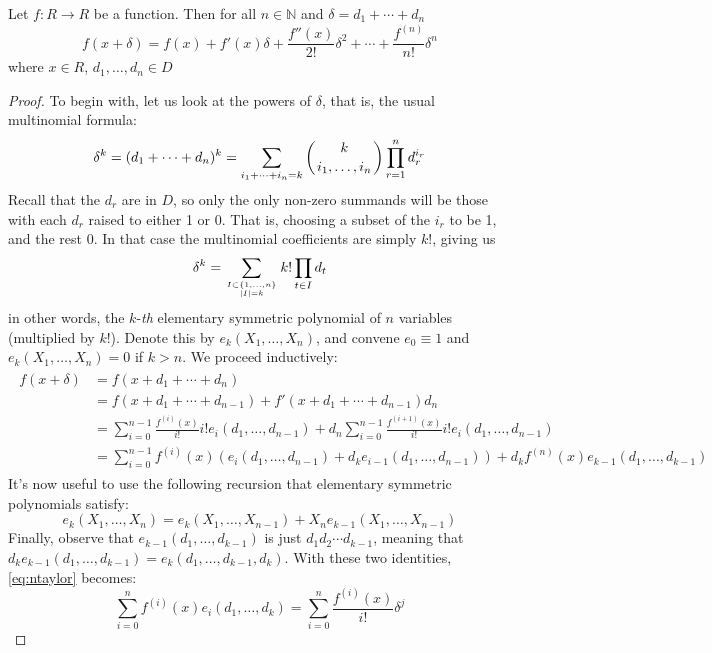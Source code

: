 \begin{proposition}
  Let \( f:R\to R \) be a function. Then for all \( n\in\mathbb N \) and \( \delta = d_1+\cdots+d_n \)
  \begin{equation*}
    f(x+\delta) = f(x) + f'(x)\delta + \frac{f''(x)}{2!}\delta^2 + \cdots + \frac{f^{(n)}}{n!}\delta^n
  \end{equation*}
  where \( x\in R \), \( d_1,\dots,d_n\in D \)
\end{proposition}

\begin{proof}
  To begin with, let us look at the powers of \( \delta \), that is, the usual multinomial formula:
  \begin{equation*}
    \delta^k = (d_1+\cdots+d_n)^k = \sum_{i_1+\cdots+i_n=k}\left( k\atop i_1,\dots,i_n \right)\prod_{r=1}^{n}d_r^{i_r}
  \end{equation*}
  Recall that the \( d_r \) are in \( D \), so only the only non-zero summands will be those with each \( d_r \) raised to either 1 or 0. That is, choosing a subset of the \( i_r \) to be 1, and the rest 0. In that case the multinomial coefficients are simply \( k! \), giving us
  \begin{equation*}
    \delta^k = \sum_{I\subset \{1,\dots,n\}\atop \lvert I \rvert=k}k!\prod_{t\in I}d_t
  \end{equation*}
  in other words, the \( k \)-\textit{th} elementary symmetric polynomial of \( n \) variables (multiplied by \( k! \)). Denote this by \( e_k(X_1,\dots,X_n) \), and convene \( e_0 \equiv 1 \) and \( e_k(X_1,\dots,X_n) = 0 \) if \( k>n \). We proceed inductively:
  \begin{align}
    \begin{split}
      f(x+\delta) & = f(x+d_1+\cdots+d_n) \\[10pt]
                  & = f(x+d_1+\cdots+d_{n-1})+f'(x+d_1+\cdots+d_{n-1})d_n \\[10pt]
		  & = \sum_{i=0}^{n-1}\frac{f^{(i)}(x)}{i!}i!e_i(d_1,\dots,d_{n-1}) + d_n\sum_{i=0}^{n-1}\frac{f^{(i+1)}(x)}{i!}i!e_i(d_1,\dots,d_{n-1}) \\[10pt]
                  & = \sum_{i=0}^{n-1}f^{(i)}(x)\left( e_i(d_1,\dots,d_{n-1})+d_ke_{i-1}(d_1,\dots,d_{n-1})\right) + d_kf^{(n)}(x)e_{k-1}(d_1,\dots,d_{k-1})
    \end{split}
    \label{eq:ntaylor}
  \end{align}
It's now useful to use the following recursion that elementary symmetric polynomials satisfy:
\begin{equation*}
  e_k(X_1,\dots,X_n) = e_{k}(X_1,\dots,X_{n-1}) + X_{n}e_{k-1}(X_1,\dots,X_{n-1})
\end{equation*}
Finally, observe that \( e_{k-1}(d_1,\dots,d_{k-1}) \) is just \( d_1d_2\cdots d_{k-1} \), meaning that \( d_ke_{k-1}(d_1,\dots,d_{k-1}) = e_k(d_1,\dots, d_{k-1},d_k) \). With these two identities, \ref{eq:ntaylor} becomes:
\begin{equation*}
  \sum_{i=0}^{n}f^{(i)}(x)e_i(d_1,\dots,d_k)= \sum_{i=0}^n \frac{f^{(i)}(x)}{i!}\delta^j
\end{equation*}
\end{proof}

